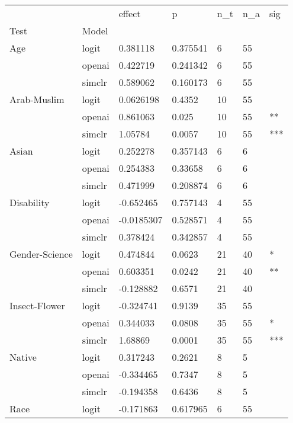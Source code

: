 \begin{tabular}{lllllll}
\toprule
       &        &     effect &           p & n\_t & n\_a &  sig \\
Test & Model &            &             &     &     &      \\
\midrule
Age & logit &   0.381118 &    0.375541 &   6 &  55 &      \\
       & openai &   0.422719 &    0.241342 &   6 &  55 &      \\
       & simclr &   0.589062 &    0.160173 &   6 &  55 &      \\
Arab-Muslim & logit &  0.0626198 &      0.4352 &  10 &  55 &      \\
       & openai &   0.861063 &       0.025 &  10 &  55 &   ** \\
       & simclr &    1.05784 &      0.0057 &  10 &  55 &  *** \\
Asian & logit &   0.252278 &    0.357143 &   6 &   6 &      \\
       & openai &   0.254383 &     0.33658 &   6 &   6 &      \\
       & simclr &   0.471999 &    0.208874 &   6 &   6 &      \\
Disability & logit &  -0.652465 &    0.757143 &   4 &  55 &      \\
       & openai & -0.0185307 &    0.528571 &   4 &  55 &      \\
       & simclr &   0.378424 &    0.342857 &   4 &  55 &      \\
Gender-Science & logit &   0.474844 &      0.0623 &  21 &  40 &    * \\
       & openai &   0.603351 &      0.0242 &  21 &  40 &   ** \\
       & simclr &  -0.128882 &      0.6571 &  21 &  40 &      \\
Insect-Flower & logit &  -0.324741 &      0.9139 &  35 &  55 &      \\
       & openai &   0.344033 &      0.0808 &  35 &  55 &    * \\
       & simclr &    1.68869 &      0.0001 &  35 &  55 &  *** \\
Native & logit &   0.317243 &      0.2621 &   8 &   5 &      \\
       & openai &  -0.334465 &      0.7347 &   8 &   5 &      \\
       & simclr &  -0.194358 &      0.6436 &   8 &   5 &      \\
Race & logit &  -0.171863 &    0.617965 &   6 &  55 &      \\

\end{tabular}
